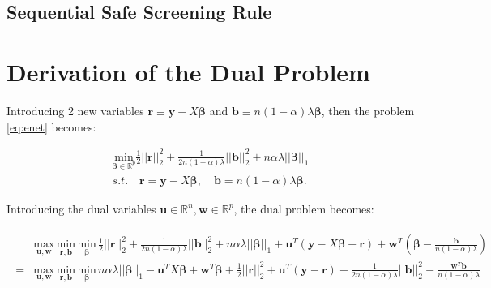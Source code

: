 \subsection{Sequential Safe Screening Rule}


\appendix
\appendixpage


\section{Derivation of the Dual Problem}


Introducing 2 new variables $\boldsymbol r\equiv \boldsymbol y-X\boldsymbol\beta$ and $\boldsymbol b\equiv n(1-\alpha)\lambda \boldsymbol\beta$, then the problem \eqref{eq:enet} becomes:

\begin{equation}
    \label{eq:dual+rb}
    \begin{gathered}
    \underset{\boldsymbol\beta\in \mathbb{R}^p}{\mathrm{min}}\frac{1}{2}||\boldsymbol r||_2^2+\frac{1}{2n(1-\alpha)\lambda}||\boldsymbol b||_2^2+n\alpha\lambda||\boldsymbol\beta||_1\\s.t.\quad \boldsymbol r=\boldsymbol y-X\boldsymbol\beta,\quad \boldsymbol b=n(1-\alpha)\lambda \boldsymbol\beta.
\end{gathered}
\end{equation}

Introducing the dual variables $\boldsymbol u\in\mathbb{R}^{n},\boldsymbol w\in\mathbb{R}^p$, the dual problem becomes:

\begin{gather}
    \label{eq:dual+uw}
    \begin{aligned}
        &\underset{\boldsymbol u,\boldsymbol w}{\mathrm{max}}\,\underset{\boldsymbol r,\boldsymbol b}{\mathrm{min}}\,\underset{\boldsymbol\beta}{\mathrm{min}}\,\frac{1}{2}||\boldsymbol r||_2^2+\frac{1}{2n(1-\alpha)\lambda}||\boldsymbol b||_2^2+n\alpha\lambda||\boldsymbol\beta||_1+\boldsymbol u^T(\boldsymbol y-X\boldsymbol\beta-\boldsymbol r)+\boldsymbol w^T\left(\boldsymbol\beta-\frac{\boldsymbol b}{n(1-\alpha)\lambda}\right)\\
        =&\underset{\boldsymbol u,\boldsymbol w}{\mathrm{max}}\,\underset{\boldsymbol r,\boldsymbol b}{\mathrm{min}}\,\underset{\boldsymbol\beta}{\mathrm{min}}\,n\alpha\lambda||\boldsymbol\beta||_1-\boldsymbol u^TX\boldsymbol\beta+\boldsymbol w^T\boldsymbol\beta+\frac{1}{2}||\boldsymbol r||_2^2+\boldsymbol u^T(\boldsymbol y-\boldsymbol r)+\frac{1}{2n(1-\alpha)\lambda}||\boldsymbol b||_2^2-\frac{\boldsymbol w^T\boldsymbol b}{n(1-\alpha)\lambda}
    \end{aligned}    
\end{gather}


